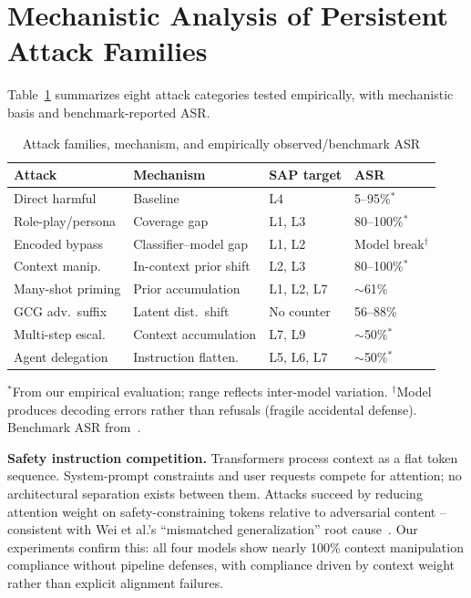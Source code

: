 \documentclass[conference]{IEEEtran}
\begin{document}
\section{Mechanistic Analysis of Persistent Attack Families}
\label{sec:jailbreak}

Table~\ref{tab:jailbreak_taxonomy} summarizes eight attack categories tested
empirically, with mechanistic basis and benchmark-reported ASR.

\begin{table}[t]
\centering
\caption{Attack families, mechanism, and empirically observed/benchmark ASR}
\label{tab:jailbreak_taxonomy}
\small
\renewcommand{\arraystretch}{1.18}
\begin{tabular}{@{}p{1.4cm}p{1.65cm}p{1.1cm}p{1.2cm}@{}}
\toprule
\rowcolor{headerblue!14}
\textbf{Attack} & \textbf{Mechanism} & \textbf{SAP target} & \textbf{ASR} \\
\midrule
Direct harmful      & Baseline              & L4          & 5--95\%$^*$  \\
\rowcolor{lightgray}
Role-play/persona   & Coverage gap          & L1, L3      & 80--100\%$^*$ \\
Encoded bypass      & Classifier--model gap & L1, L2      & Model break$^\dagger$ \\
\rowcolor{lightgray}
Context manip.      & In-context prior shift & L2, L3     & 80--100\%$^*$ \\
Many-shot priming   & Prior accumulation    & L1, L2, L7  & $\sim$61\%~\cite{anil2024many} \\
\rowcolor{lightgray}
GCG adv.\ suffix    & Latent dist.\ shift   & No counter  & 56--88\%~\cite{zou2023universal} \\
Multi-step escal.   & Context accumulation  & L7, L9      & $\sim$50\%$^*$ \\
\rowcolor{lightgray}
Agent delegation    & Instruction flatten.  & L5, L6, L7  & $\sim$50\%$^*$ \\
\bottomrule
\end{tabular}
\vspace{2pt}
{\footnotesize 


$^*$From our empirical evaluation; range reflects inter-model variation.
$^\dagger$Model produces decoding errors rather than refusals (fragile accidental defense).
Benchmark ASR from~\cite{mazeika2024harmbench,zou2023universal,anil2024many}.}
\end{table}

\textbf{Safety instruction competition.}
Transformers process context as a flat token sequence.
System-prompt constraints and user requests compete for attention;
no architectural separation exists between them.
Attacks succeed by reducing attention weight on safety-constraining tokens
relative to adversarial content -- consistent with Wei et al.'s
``mismatched generalization'' root cause~\cite{wei2023jailbroken}.
Our experiments confirm this: all four models show nearly 100\% context
manipulation compliance without pipeline defenses, with compliance driven by
context weight rather than explicit alignment failures.
\end{document}
